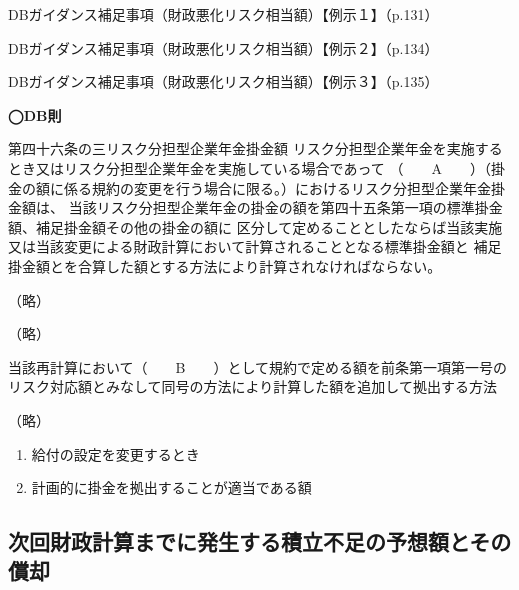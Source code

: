 \begin{explanationbox}
  DBガイダンス補足事項（財政悪化リスク相当額）【例示１】（p.131）

DBガイダンス補足事項（財政悪化リスク相当額）【例示２】（p.134）

DBガイダンス補足事項（財政悪化リスク相当額）【例示３】（p.135）
\end{explanationbox}

\begin{fillblank}[数理人試験 2024 問題4 設問2 C,D]
  \noindent \textbf{◯DB則}
  \begin{lawstructure}
    \begin{lawarticle}{第四十六条の三}{リスク分担型企業年金掛金額}
      リスク分担型企業年金を実施するとき又はリスク分担型企業年金を実施している場合であって
      （　　A　　）（掛金の額に係る規約の変更を行う場合に限る。）におけるリスク分担型企業年金掛金額は、
      当該リスク分担型企業年金の掛金の額を第四十五条第一項の標準掛金額、補足掛金額その他の掛金の額に
      区分して定めることとしたならば当該実施又は当該変更による財政計算において計算されることとなる標準掛金額と
      補足掛金額とを合算した額とする方法により計算されなければならない。

      （略）

      （略）

      当該再計算において（　　B　　）として規約で定める額を前条第一項第一号の
      リスク対応額とみなして同号の方法により計算した額を追加して拠出する方法

      （略）
    \end{lawarticle}
  \end{lawstructure}  
\end{fillblank}

\begin{answerbox}
  \begin{enumerate}[A: ]
    \item 給付の設定を変更するとき
    \item 計画的に掛金を拠出することが適当である額
  \end{enumerate}
\end{answerbox}

\newpage

\subsection{次回財政計算までに発生する積立不足の予想額とその償却}

